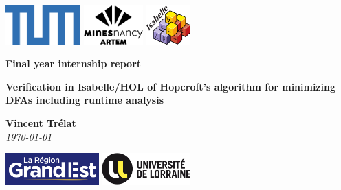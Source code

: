 \documentclass[12pt, a4 paper]{article}
\theoremstyle{definition}
\begin{document}
\begin{titlepage}
    \begin{center}
        \vfill
        \includegraphics[height=1.5cm]{img/logoTUM.png}
        \hfill
        \includegraphics[height=1.5cm]{img/logoartem.png}
        \hfill
        \includegraphics[height=1.5cm]{img/logoisabelle.png}
        \vfill
    \end{center}
    \begin{center}
        
        \textbf{Final year internship report}
        \vfill

        \large{\textbf{Verification in Isabelle/HOL of Hopcroft's algorithm for minimizing DFAs including runtime analysis}}
    \end{center}
    
    \vfill
    
    \begin{center}
        \textbf{Vincent Trélat}\\
        \vspace{1cm}
        \textit{\today}
    \end{center}
    \vfill
    \begin{center}
        \includegraphics[height=1.2cm]{img/logoGE.png}
        \hfill
        \includegraphics[height=1.2cm]{img/logoUL.png}
    \end{center}
\end{titlepage}

\tableofcontents

\pagebreak
\end{document}
